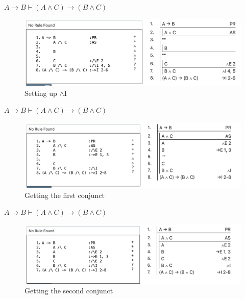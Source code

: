\documentclass[
  ignorenonframetext,
]{beamer}
\renewcommand{\,}{\text{, }}
\begin{document}
\begin{frame}{\(A \rightarrow B \vdash (A \wedge C) \rightarrow (B \wedge C)\)}
\protect\hypertarget{a-rightarrow-b-vdash-a-wedge-c-rightarrow-b-wedge-c-2}{}
\begin{figure}
\centering
\includegraphics[width=\textwidth,height=0.75\textheight]{5_4ii.png}
\caption{Setting up \(\wedge\)I}
\end{figure}
\end{frame}

\begin{frame}{\(A \rightarrow B \vdash (A \wedge C) \rightarrow (B \wedge C)\)}
\protect\hypertarget{a-rightarrow-b-vdash-a-wedge-c-rightarrow-b-wedge-c-3}{}
\begin{figure}
\centering
\includegraphics[width=\textwidth,height=0.75\textheight]{5_4j.png}
\caption{Getting the first conjunct}
\end{figure}
\end{frame}

\begin{frame}{\(A \rightarrow B \vdash (A \wedge C) \rightarrow (B \wedge C)\)}
\protect\hypertarget{a-rightarrow-b-vdash-a-wedge-c-rightarrow-b-wedge-c-4}{}
\begin{figure}
\centering
\includegraphics[width=\textwidth,height=0.75\textheight]{5_4k.png}
\caption{Getting the second conjunct}
\end{figure}
\end{frame}
\end{document}

